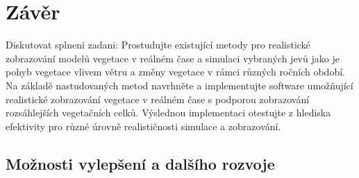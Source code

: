 \chapter{Závěr}
\label{chap:zaver}

Diskutovat splneni zadani:
Prostudujte existující metody pro realistické zobrazování modelů vegetace v reálném čase a simulaci vybraných jevů jako je pohyb vegetace vlivem větru a změny vegetace v rámci různých ročních období. Na základě nastudovaných metod navrhněte a implementujte software umožňující realistické zobrazování vegetace v reálném čase s podporou zobrazování rozsáhlejších vegetačních celků. Výslednou implementaci otestujte z hlediska efektivity pro různé úrovně realističnosti simulace a zobrazování.


\section{Možnosti vylepšení a dalšího rozvoje}

